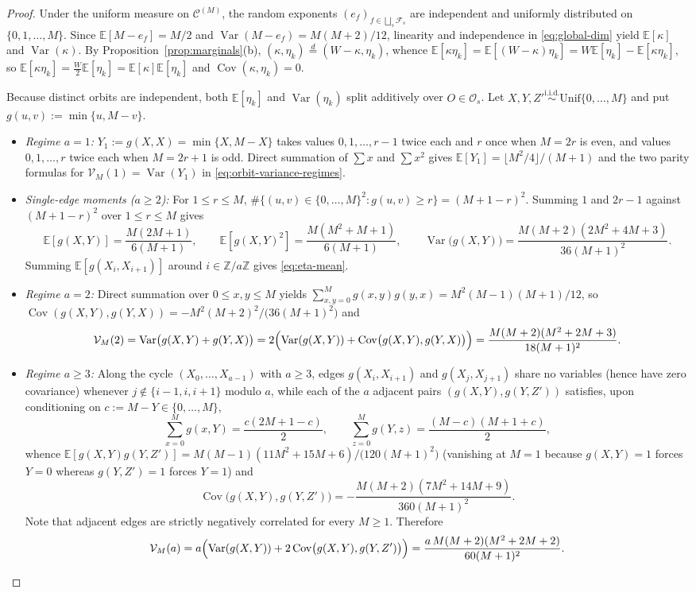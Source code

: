 \documentclass[preprint,12pt]{elsarticle}
\newcommand{\Z}{\mathbb Z}
\newcommand{\Fs}{\mathcal F_s}
\newcommand{\Os}{\mathcal O_s}
\newcommand{\Var}{\operatorname{Var}}
\newcommand{\Cov}{\operatorname{Cov}}
\numberwithin{equation}{section}
\theoremstyle{plain}
\theoremstyle{definition}
\theoremstyle{remark}
\begin{document}
\begin{proof}
Under the uniform measure on $\mathscr C^{(M)}$, the random exponents
$(e_f)_{f\in\bigsqcup_s\Fs}$ are independent and uniformly distributed on
$\{0,1,\dots,M\}$. Since $\mathbb E[M-e_f]=M/2$ and
$\Var(M-e_f)=M(M+2)/12$, linearity and independence in \eqref{eq:global-dim} yield
$\mathbb E[\kappa]$ and $\Var(\kappa)$. By Proposition~\ref{prop:marginals}\textup{(b)},
$(\kappa,\eta_k)\stackrel{d}{=}(W-\kappa,\eta_k)$, whence
$\mathbb E[\kappa\eta_k]=\mathbb E[(W-\kappa)\eta_k]=W\mathbb E[\eta_k]-\mathbb E[\kappa\eta_k]$,
so $\mathbb E[\kappa\eta_k]=\frac{W}{2}\mathbb E[\eta_k]=\mathbb E[\kappa]\mathbb E[\eta_k]$
and $\Cov(\kappa,\eta_k)=0$.

Because distinct orbits are independent, both $\mathbb E[\eta_k]$ and
$\Var(\eta_k)$ split additively over $O\in\Os$. Let $X,Y,Z'\stackrel{\mathrm{i.i.d.}}{\sim}
\mathrm{Unif}\{0,\dots,M\}$ and put $g(u,v):=\min\{u,M-v\}$.
\begin{itemize}
\item \emph{Regime $a=1$:} $Y_1:=g(X,X)=\min\{X,M-X\}$ takes values
$0,1,\dots,r-1$ twice each and $r$ once when $M=2r$ is even, and values
$0,1,\dots,r$ twice each when $M=2r+1$ is odd. Direct summation of $\sum x$ and
$\sum x^2$ gives $\mathbb E[Y_1]=\lfloor M^2/4\rfloor/(M+1)$ and the two parity
formulas for $\mathcal V_M(1)=\Var(Y_1)$ in \eqref{eq:orbit-variance-regimes}.
\item \emph{Single-edge moments ($a\ge 2$):} For $1\le r\le M$,
$\#\{(u,v)\in\{0,\dots,M\}^2:g(u,v)\ge r\}=(M+1-r)^2$. Summing $1$ and $2r-1$
against $(M+1-r)^2$ over $1\le r\le M$ gives
\[
\mathbb E[g(X,Y)]=\frac{M(2M+1)}{6(M+1)},
\qquad
\mathbb E[g(X,Y)^2]=\frac{M(M^2+M+1)}{6(M+1)},
\qquad
\Var\bigl(g(X,Y)\bigr)=\frac{M(M+2)(2M^2+4M+3)}{36(M+1)^2}.
\]
Summing $\mathbb E[g(X_i,X_{i+1})]$ around $i\in\Z/a\Z$ gives \eqref{eq:eta-mean}.
\item \emph{Regime $a=2$:} Direct summation over $0\le x,y\le M$ yields
$\sum_{x,y=0}^{M}g(x,y)g(y,x)=M^2(M-1)(M+1)/12$, so
$\Cov(g(X,Y),g(Y,X))=-M^2(M+2)^2/\bigl(36(M+1)^2\bigr)$ and
\[
\mathcal V_M(2)=\Var\bigl(g(X,Y)+g(Y,X)\bigr)
 =2\Bigl(\Var(g(X,Y))+\Cov\bigl(g(X,Y),g(Y,X)\bigr)\Bigr)
 =\frac{M(M+2)(M^2+2M+3)}{18(M+1)^2}.
\]
\item \emph{Regime $a\ge 3$:} Along the cycle $(X_0,\dots,X_{a-1})$ with $a\ge 3$,
edges $g(X_i,X_{i+1})$ and $g(X_j,X_{j+1})$ share no variables (hence have zero
covariance) whenever $j\notin\{i-1,i,i+1\}$ modulo $a$, while each of the $a$
adjacent pairs $(g(X,Y),g(Y,Z'))$ satisfies, upon conditioning on $c:=M-Y\in\{0,\dots,M\}$,
\[
\sum_{x=0}^{M}g(x,Y)=\frac{c(2M+1-c)}{2},
\qquad
\sum_{z=0}^{M}g(Y,z)=\frac{(M-c)(M+1+c)}{2},
\]
whence $\mathbb E[g(X,Y)g(Y,Z')]=M(M-1)(11M^2+15M+6)/\bigl(120(M+1)^2\bigr)$
(vanishing at $M=1$ because $g(X,Y)=1$ forces $Y=0$ whereas $g(Y,Z')=1$ forces
$Y=1$) and
\[
\Cov\bigl(g(X,Y),g(Y,Z')\bigr)=-\frac{M(M+2)(7M^2+14M+9)}{360(M+1)^2}.
\]
Note that adjacent edges are strictly negatively correlated for every $M\ge 1$.
Therefore
\[
\mathcal V_M(a)=a\Bigl(\Var(g(X,Y))+2\Cov\bigl(g(X,Y),g(Y,Z')\bigr)\Bigr)
 =\frac{a\,M(M+2)(M^2+2M+2)}{60(M+1)^2}.\qedhere
\]
\end{itemize}
\end{proof}
\end{document}
